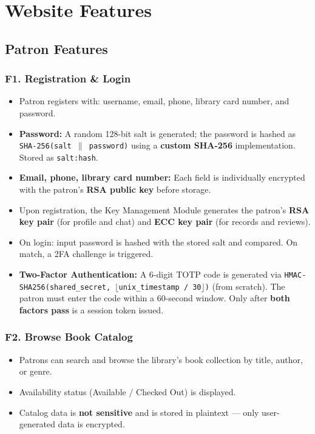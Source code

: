 \documentclass[12pt]{article}
\begin{document}
\section{Website Features}

\subsection{Patron Features}

\subsubsection{F1. Registration \& Login}
\begin{itemize}
    \item Patron registers with: username, email, phone, library card number, and password.
    \item \textbf{Password:} A random 128-bit salt is generated; the password is hashed as \texttt{SHA-256(salt $\|$ password)} using a \textbf{custom SHA-256} implementation. Stored as \texttt{salt:hash}.
    \item \textbf{Email, phone, library card number:} Each field is individually encrypted with the patron's \textbf{RSA public key} before storage.
    \item Upon registration, the Key Management Module generates the patron's \textbf{RSA key pair} (for profile and chat) and \textbf{ECC key pair} (for records and reviews).
    \item On login: input password is hashed with the stored salt and compared. On match, a 2FA challenge is triggered.
    \item \textbf{Two-Factor Authentication:} A 6-digit TOTP code is generated via \texttt{HMAC-SHA256(shared\_secret, $\lfloor$unix\_timestamp / 30$\rfloor$)} (from scratch). The patron must enter the code within a 60-second window. Only after \textbf{both factors pass} is a session token issued.
\end{itemize}

\subsubsection{F2. Browse Book Catalog}
\begin{itemize}
    \item Patrons can search and browse the library's book collection by title, author, or genre.
    \item Availability status (Available / Checked Out) is displayed.
    \item Catalog data is \textbf{not sensitive} and is stored in plaintext --- only user-generated data is encrypted.
\end{itemize}
\end{document}
